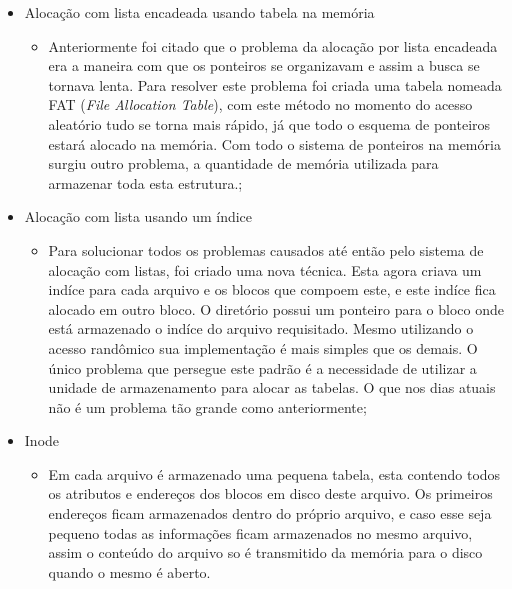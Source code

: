 \documentclass[12pt,a4paper,openany,oneside]{abntex2}
\begin{document}
\begin{itemize}

\item Alocação com lista encadeada usando tabela na memória

	\begin{itemize}
		\item Anteriormente foi citado que o problema da alocação por lista encadeada era a maneira com que os ponteiros se organizavam e assim a busca se tornava lenta. Para resolver este problema foi criada uma tabela nomeada FAT (\textit{File Allocation Table}), com este método no momento do acesso aleatório tudo se torna mais rápido, já que todo o esquema de ponteiros estará alocado na memória. Com todo o sistema de ponteiros na memória surgiu outro problema, a quantidade de memória utilizada para armazenar toda esta estrutura.;
	\end{itemize}

\item Alocação com lista usando um índice

	\begin{itemize}
		\item Para solucionar todos os problemas causados até então pelo sistema de alocação com listas, foi criado uma nova técnica. Esta agora criava um indíce para cada arquivo e os blocos que compoem este, e este indíce fica alocado em outro bloco. O diretório possui um ponteiro para o bloco onde está armazenado o indíce do arquivo requisitado. Mesmo utilizando o acesso randômico sua implementação é mais simples que os demais. O único problema que persegue este padrão é a necessidade de utilizar a unidade de armazenamento para alocar as tabelas. O que nos dias atuais não é um problema tão grande como anteriormente;

	\end{itemize}


\item Inode

	\begin{itemize}
		\item Em cada arquivo é armazenado uma pequena tabela, esta contendo todos os atributos e endereços dos blocos em disco deste arquivo. Os primeiros endereços ficam armazenados dentro do próprio arquivo, e caso esse seja pequeno todas as informações ficam armazenados no mesmo arquivo, assim o conteúdo do arquivo so é transmitido da memória para o disco quando o mesmo é aberto.
	\end{itemize}



\end{itemize}
\end{document}
